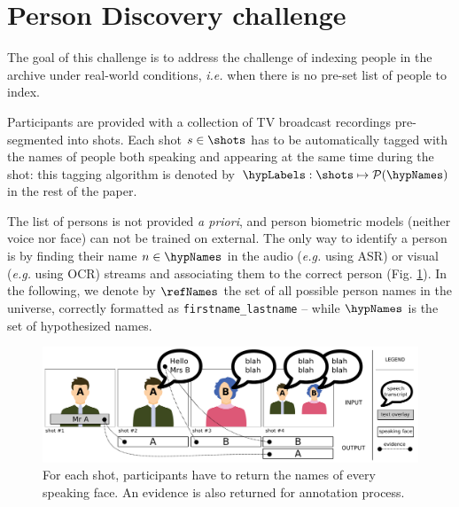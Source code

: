 \section{Person Discovery challenge}
\label{sec:challenge}


The goal of this challenge is to address the challenge of indexing people in the archive under real-world conditions, \emph{i.e.} when there is no pre-set list of people to index.

 Participants are provided with a collection of TV broadcast recordings pre-segmented into shots.
Each shot $s \in \shots$ has to be automatically tagged with the names of people both speaking and appearing at the same time during the shot: this tagging algorithm is denoted by $\hypLabels : \shots \mapsto \mathcal{P}(\hypNames)$ in the rest of the paper.

The list of persons is not provided \emph{a priori}, and person biometric models (neither voice nor face) can not be trained on external. The only way to identify a person is by finding their name $n \in \hypNames$ in the audio (\emph{e.g.} using ASR) or visual (\emph{e.g.} using OCR) streams and associating them to the correct person (Fig. \ref{fig:evidence}). %
In the following, we denote by $\refNames$ the set of all possible person names in the universe, correctly formatted as \texttt{firstname\_lastname} -- while $\hypNames$ is the set of hypothesized names.

\begin{figure}[tb]
 \centering
 \includegraphics[width=1.\linewidth]{evidence.pdf}
\vspace*{-5mm}
 \caption{For each shot, participants have to return the names of every speaking face. An evidence is also returned for annotation process.}
\vspace*{-3mm}
 \label{fig:evidence}
\end{figure}

